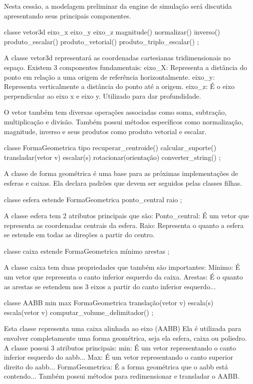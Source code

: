 Nesta cessão, a modelagem preliminar da engine de simulação será discutida apresentando seus principais componentes.

classe vetor3d
{
eixo_x
eixo_y
eixo_z
magnitude()
normalizar()
inverso()
produto_escalar()
produto_vetorial()
produto_triplo_escalar()
};

A classe vetor3d representará as coordenadas cartesianas tridimensionais no
espaço. Existem 3 componentes fundamentais:
eixo_X: Representa a distância do ponto em relação a uma origem de referência horizontalmente.
eixo_y: Representa verticalmente a distância do ponto até a origem.
eixo_z: É o eixo perpendicular ao eixo x e eixo y. Utilizado para dar profundidade.

O vetor também tem diversas operações associadas como soma, subtração,
multiplicação e divisão. Também possui métodos específicos como normalização,
magnitude, inverso e seus produtos como produto vetorial e escalar.

classe FormaGeometrica
{
tipo
recuperar_centroide()
calcular_suporte()
transladar(vetor v)
escalar(s)
rotacionar(orientação)
converter_string()
};

A classe de forma geométrica é uma base para as próximas implementações de
esferas e caixas.
Ela declara padrões que devem ser seguidos pelas classes filhas.

classe esfera estende FormaGeometrica
{
ponto_central
raio
};

A classe esfera tem 2 atributos principais que são:
Ponto_central: É um vetor que representa as coordenadas centrais da esfera.
Raio: Representa o quanto a esfera se estende em todas as direções a partir do
centro.

classe caixa  estende FormaGeometrica
{
mínimo
arestas
};

A classe caixa tem duas propriedades que também são importantes:
Mínimo: É um vetor que representa o canto inferior esquerdo da caixa.
Arestas: É o quanto as arestas se estendem nos 3 eixos a partir do canto
inferior esquerdo...

classe AABB
{
min
max
FormaGeometrica
translação(vetor v)
escala(s)
escala(vetor v)
computar_volume_delimitador()
};

Esta classe representa uma caixa alinhada ao eixo (AABB) Ela é utilizada para
envolver completamente uma forma geométrica, seja ela esfera, caixa ou
poliedro.
A classe possui 3 atributos principais:
min: É um vetor representando o canto inferior esquerdo do aabb...
Max: É um vetor representando o canto superior direito do aabb...
FormaGeometrica: É a forma geométrica que o aabb está contendo...
Também possui métodos para redimensionar e transladar o AABB.

